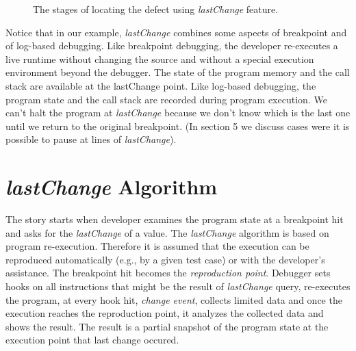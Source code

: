\documentclass[preprint]{sigplanconf}
\begin{document}
\begin{figure}[htp]

\caption{The stages of locating the defect using \textit{lastChange} feature.}
\label{fig:lastChange}
\end{figure}


Notice that in our example, \textit{lastChange} combines some aspects
of breakpoint and of log-based debugging. Like breakpoint debugging,
the developer re-executes a live runtime without changing the source
and without a special execution environment beyond the debugger. The
state of the program memory and the call stack are available at the
lastChange point. Like log-based debugging, the program state and the
call stack are recorded during program execution. We can't halt the
program at \textit{lastChange} because we don't know which is the last
one until we return to the original breakpoint. (In section 5 we
discuss cases were it is possible to pause at lines of \textit{lastChange}).

\section{\textit{lastChange} Algorithm}

The story starts when developer examines the program state at a breakpoint hit and asks for the \textit{lastChange} of a value. The \textit{lastChange} algorithm is based on program re-execution. Therefore it is assumed that the execution can be reproduced automatically (e.g., by a given test case) or with the developer's assistance. The breakpoint hit becomes the \textit{reproduction point}. Debugger sets hooks on all instructions that might be the result of \textit{lastChange} query, re-executes the program, at every hook hit, \textit{change event}, collects limited data and once the execution reaches the reproduction point, it analyzes the collected data and shows the result. The result is a partial snapshot of the program state at the execution point that last change occured. 
\end{document}
